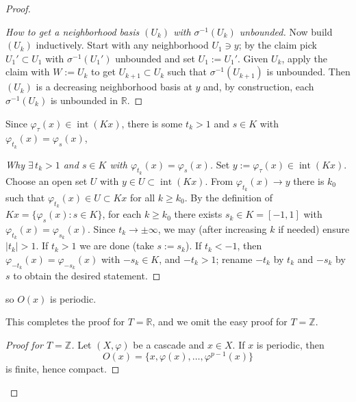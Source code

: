 \begin{proof}
\begin{mynote}
\begin{proof}[How to get a neighborhood basis $(U_k)$ with $\sigma^{-1}(U_k)$ unbounded]
            \smallskip
            Now build $(U_k)$ inductively.
            Start with any neighborhood $U_1\ni y$; by the claim pick $U_1'\subset U_1$ with $\sigma^{-1}(U_1')$ unbounded and set $U_1:=U_1'$.
            Given $U_k$, apply the claim with $W:=U_k$ to get $U_{k+1}\subset U_k$ such that $\sigma^{-1}(U_{k+1})$ is unbounded.
            Then $(U_k)$ is a decreasing neighborhood basis at $y$ and, by construction,
            each $\sigma^{-1}(U_k)$ is unbounded in $\mathbb R$.
        \end{proof}
    \end{mynote}
    Since $\varphi_\tau(x) \in \operatorname{int}(Kx)$, there is some $t_k > 1$ and $s \in K$ with $\varphi_{t_k}(x) = \varphi_s(x)$,
    \begin{mynote}
        \begin{proof}[Why $\exists\,t_k>1$ and $s\in K$ with $\varphi_{t_k}(x)=\varphi_s(x)$]
            Set $y:=\varphi_\tau(x)\in\operatorname{int}(Kx)$. Choose an open set $U$ with
            $y\in U\subset\operatorname{int}(Kx)$. From $\varphi_{t_k}(x)\to y$ there is $k_0$ such that
            $\varphi_{t_k}(x)\in U\subset Kx$ for all $k\ge k_0$. By the definition of $Kx=\{\varphi_s(x):s\in K\}$,
            for each $k\ge k_0$ there exists $s_k\in K=[-1,1]$ with $\varphi_{t_k}(x)=\varphi_{s_k}(x)$.
            Since $t_k\to\pm\infty$, we may (after increasing $k$ if needed) ensure $|t_k|>1$.
            If $t_k>1$ we are done (take $s:=s_k$). If $t_k<-1$, then
            $\varphi_{-t_k}(x)=\varphi_{-s_k}(x)$ with $-s_k\in K$, and $-t_k>1$; rename $-t_k$ by $t_k$
            and $-s_k$ by $s$ to obtain the desired statement.
        \end{proof}
    \end{mynote}
    so $O(x)$ is periodic.

    This completes the proof for $T = \mathbb{R}$, and we omit the easy proof for $T = \mathbb{Z}$.
    \begin{mynote}
        \begin{proof}[Proof for $T=\mathbb Z$]
            Let $(X,\varphi)$ be a cascade and $x\in X$. If $x$ is periodic, then
            \[
                O(x)=\{x,\varphi(x),\dots,\varphi^{p-1}(x)\}
            \]
            is finite, hence compact.


\end{proof}
\end{mynote}
\end{proof}
